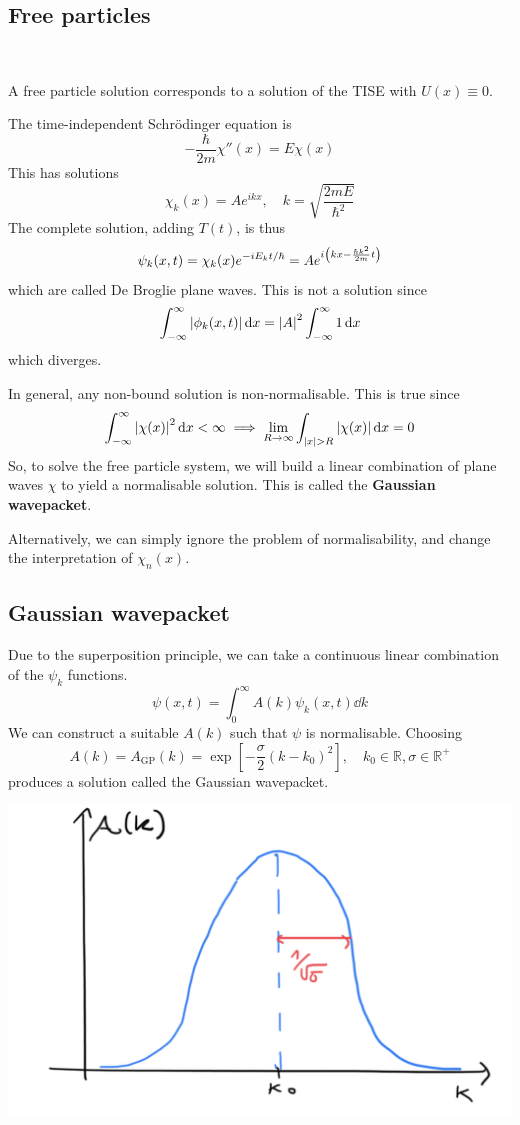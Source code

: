 \documentclass[a4paper]{article}
\begin{document}
\subsection{Free particles}\ \vspace{-1.5em}

\begin{definition}
    A free particle solution corresponds to a solution of the TISE with $U(x) \equiv 0$.
\end{definition}

The time-independent Schr\"odinger equation is
\[
	-\frac{\hbar}{2m} \chi''(x) = E\chi(x)
\]
This has solutions
\[
	\chi_k(x) = A e^{i k x},\quad k = \sqrt{\frac{2mE}{\hbar^2}}
\]
The complete solution, adding \( T(t) \), is thus
\[
	\psi_k(x,t) = \chi_k(x) e^{-i E_k t / \hbar} = A e^{i\qty(kx - \frac{\hbar k^2}{2m} t)}
\]
which are called De Broglie plane waves.
This is not a solution since
\[
	\int_{-\infty}^\infty \abs{\phi_k(x,t)} \,\mathrm{d}{x} = \abs{A}^2 \int_{-\infty}^\infty 1 \,\mathrm{d}{x}
\]
which diverges.

In general, any non-bound solution is non-normalisable.
This is true since \[
    \int_{-\infty}^\infty \abs{\chi(x)}^2 \,\mathrm{d}{x} < \infty \implies \lim_{R \to \infty} \int_{\abs{x} > R} \abs{\chi(x)} \,\mathrm{d}{x} = 0
\]
So, to solve the free particle system, we will build a linear combination of plane waves \( \chi \) to yield a normalisable solution.
This is called the \textbf{Gaussian wavepacket}.

Alternatively, we can simply ignore the problem of normalisability, and change the interpretation of \( \chi_n(x) \).

\subsection{Gaussian wavepacket}
Due to the superposition principle, we can take a continuous linear combination of the \( \psi_k \) functions.
\[
	\psi(x,t) = \int_0^\infty A(k) \psi_k(x,t) \dd{k}
\]
We can construct a suitable \( A(k) \) such that \( \psi \) is normalisable.
Choosing
\[
	A(k) = A_{\text{GP}}(k) = \exp[-\frac{\sigma}{2}(k-k_0)^2],\quad k_0 \in \mathbb R, \sigma \in \mathbb R^+
\]
produces a solution called the Gaussian wavepacket.

\begin{center}
    \includegraphics[scale=0.2]{qm8.png}
\end{center}
\end{document}
